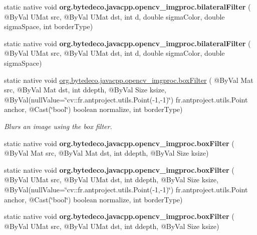 \begin{DoxyCompactItemize}
\item 
\mbox{\label{group__imgproc__filter_gab8e7ddbf6f483c6b5510fcc2a1d9dccc}} 
static native void {\bfseries org.\+bytedeco.\+javacpp.\+opencv\+\_\+imgproc.\+bilateral\+Filter} ( @By\+Val U\+Mat src, @By\+Val U\+Mat dst, int d, double sigma\+Color, double sigma\+Space, int border\+Type)
\item 
\mbox{\label{group__imgproc__filter_ga4365573ba2b1f21196b689634f7bcfea}} 
static native void {\bfseries org.\+bytedeco.\+javacpp.\+opencv\+\_\+imgproc.\+bilateral\+Filter} ( @By\+Val U\+Mat src, @By\+Val U\+Mat dst, int d, double sigma\+Color, double sigma\+Space)
\item 
static native void \hyperlink{group__imgproc__filter_ga479aa13dd62a69ab5b1a1eac3324ab23}{org.\+bytedeco.\+javacpp.\+opencv\+\_\+imgproc.\+box\+Filter} ( @By\+Val Mat src, @By\+Val Mat dst, int ddepth, @By\+Val Size ksize, @By\+Val(null\+Value=\char`\"{}cv\+::\+fr.antproject.utils.Point(-\/1,-\/1)\char`\"{}) fr.antproject.utils.Point anchor, @Cast(\char`\"{}bool\char`\"{}) boolean normalize, int border\+Type)
\begin{DoxyCompactList}\small\item\em Blurs an image using the box filter. \end{DoxyCompactList}\item 
\mbox{\label{group__imgproc__filter_gabd35586e95d9c496428ff5883fb88c1a}} 
static native void {\bfseries org.\+bytedeco.\+javacpp.\+opencv\+\_\+imgproc.\+box\+Filter} ( @By\+Val Mat src, @By\+Val Mat dst, int ddepth, @By\+Val Size ksize)
\item 
\mbox{\label{group__imgproc__filter_ga9a5b129f9524b7ce80d094e58a5977a6}} 
static native void {\bfseries org.\+bytedeco.\+javacpp.\+opencv\+\_\+imgproc.\+box\+Filter} ( @By\+Val U\+Mat src, @By\+Val U\+Mat dst, int ddepth, @By\+Val Size ksize, @By\+Val(null\+Value=\char`\"{}cv\+::\+fr.antproject.utils.Point(-\/1,-\/1)\char`\"{}) fr.antproject.utils.Point anchor, @Cast(\char`\"{}bool\char`\"{}) boolean normalize, int border\+Type)
\item 
\mbox{\label{group__imgproc__filter_ga9130f8858ef9c58528215e2b91a7b1fe}} 
static native void {\bfseries org.\+bytedeco.\+javacpp.\+opencv\+\_\+imgproc.\+box\+Filter} ( @By\+Val U\+Mat src, @By\+Val U\+Mat dst, int ddepth, @By\+Val Size ksize)

\end{DoxyCompactItemize}
